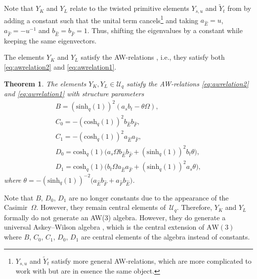 \documentclass[pdftex]{sigma}
\numberwithin{equation}{section}
\newtheorem{Theorem}{Theorem}[section]
\newcommand{\aw}{\mathrm{AW}\!\left(3\right)}
\newcommand{\chq}{\mathrm{cosh}_q}
\newcommand{\shq}{\mathrm{sinh}_q}
\newcommand{\Uq}{\mathcal{U}_q}
\begin{document}
Note that $Y_K$ and $Y_L$ relate to the twisted primitive elements $Y_{s,u}$ and $\tilde{Y}_{t}$ from \cite{Groenevelt2021} by adding a constant such that the unital term cancels\footnote{$Y_{s,u}$ and $\tilde{Y}_{t}$ satisfy more general AW-relations, which are more complicated to work with but are in essence the same object.} and taking $a_{\hat{E}}=u$, $a_{\hat{F}}=-u^{-1}$ and $b_{\hat{E}}=b_{\hat{F}}=1$. Thus, shifting the eigenvalues by a constant while keeping the same eigenvectors.

The elements $Y_K$ and $Y_L$ satisfy the AW-relations \cite{Granovskii1993}, i.e., they satisfy both \eqref{eq:awrelation2} and \eqref{eq:awrelation1}.
\begin{Theorem}\label{thm:tpeaw3}
	The elements $Y_{K},Y_{L}\in\Uq$ satisfy the AW-relations \eqref{eq:awrelation2} and \eqref{eq:awrelation1} with structure parameters
	\begin{gather}
B= (\shq(1))^2 (a_s b_t- \theta\Omega ),\nonumber\\
C_0= - (\chq(1))^2 b_{\hat{E}} b_{\hat{F}},\nonumber\\
C_1= -(\chq(1))^2a_{\hat{E}}a_{\hat{F}},\nonumber\\
D_0 = \chq(1)\big( a_s\Omega b_{\hat{E}} b_{\hat{F}}+(\shq(1))^2b_t\theta\big),\nonumber\\
D_1 = \chq(1)\big( b_t\Omega a_{\hat{E}}a_{\hat{F}}+(\shq(1))^2a_s\theta\big),\label{eq:embeddingconstants}
\end{gather}
where $\theta=-(\shq(1))^{-2}\big(a_{\hat{E}}b_{\hat{F}} + a_{\hat{F}}b_{\hat{E}}\big)$.
\end{Theorem}

\begin{Remark}Note that $B$, $D_0$, $D_1$ are no longer constants due to the appearance of the Casimir~$\Omega$. However, they remain central elements of~$\Uq$. Therefore, $Y_K$ and $Y_L$ formally do not generate an AW(3) algebra. However, they do generate a universal Askey--Wilson algebra \cite{Terwilliger2011}, which is the central extension of $\aw$ where $B$, $C_0$, $C_1$, $D_0$, $D_1$ are central elements of the algebra instead of constants.
\end{Remark}
\end{document}
